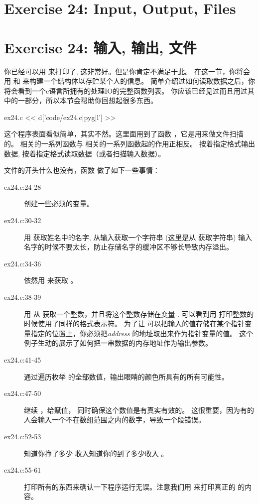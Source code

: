 \chapter{Exercise 24: Input, Output, Files}
\chapter{Exercise 24: 输入, 输出, 文件}

你已经可以用  来打印了, 这非常好。但是你肯定不满足于此。 
在这一节，你将会用  和  来构建一个结构体以存贮某个人的信息。
简单介绍过如何读取数据之后，你将会看到一个c语言所拥有的处理IO的完整函数列表。
你应该已经见过而且用过其中的一部分，所以本节会帮助你回想起很多东西。

\begin{code}{ex24.c}
<< d['code/ex24.c|pyg|l'] >>
\end{code}

这个程序表面看似简单，其实不然。这里面用到了函数 ，它是用来做文件扫描的。
  相关的一系列函数与  相关的一系列函数起的作用正相反。 
  按着指定格式输出数据,  按着指定格式读取数据（或者扫描输入数据）。

文件的开头什么也没有，函数  做了如下一些事情：

\begin{description}
\item[ex24.c:24-28] 创建一些必须的变量。
\item[ex24.c:30-32] 用 获取姓名中的名字, 从输入获取一个字符串
    (这里是从 获取字符串) 输入名字的时候不要太长，防止存储名字的缓冲区不够长导致内存溢出。
\item[ex24.c:34-36] 依然用 来获取 。
\item[ex24.c:38-39] 用 从 获取一个整数，并且将这个整数存储在变量
    .  可以看到用 打印整数的时候使用了同样的格式表示符。
    为了让  可以把输入的值存储在某个指针变量指定的位置上，你必须把\emph{address} 的地址取出来作为指针变量的值。 
    这个例子生动的展示了如何把一串数据的内存地址作为输出参数。
\item[ex24.c:41-45] 通过遍历枚举  的全部数值，输出眼睛的颜色所具有的所有可能性。
\item[ex24.c:47-50] 继续  ，给赋值， 
    同时确保这个数值是有真实有效的。 这很重要，因为有的人会输入一个不在数组范围之内的数字，导致一个段错误。
\item[ex24.c:52-53] 知道你挣了多少 收入知道你的到了多少收入 。
\item[ex24.c:55-61] 打印所有的东西来确认一下程序运行无误。注意我们用  来打印真正的 的内容。
\end{description}


